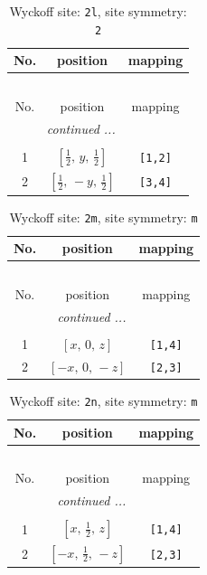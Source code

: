 \documentclass[fleqn,8pt]{jsarticle}
\begin{document}
\renewcommand{\arraystretch}{1.2}
\begin{longtable}{ccc}
\caption{Wyckoff site: {\tt 2l}, site symmetry: {\tt 2}}
 \\
 \hline \hline
No. & position & mapping \\ \hline \endfirsthead

\multicolumn{2}{l}{\tablename\ \thetable{}} \\
 \hline \hline
No. & position & mapping \\ \hline \endhead

 \hline \hline
\multicolumn{2}{r}{\footnotesize\it continued ...} \\ \endfoot

 \hline \hline
\multicolumn{2}{r}{} \\ \endlastfoot

1 & $\left[ \frac{1}{2},\, y,\, \frac{1}{2} \right]$ & {\tt [1,2]} \\ \hline
2 & $\left[ \frac{1}{2},\, - y,\, \frac{1}{2} \right]$ & {\tt [3,4]} \\
\end{longtable}
\renewcommand{\arraystretch}{1.2}
\begin{longtable}{ccc}
\caption{Wyckoff site: {\tt 2m}, site symmetry: {\tt m}}
 \\
 \hline \hline
No. & position & mapping \\ \hline \endfirsthead

\multicolumn{2}{l}{\tablename\ \thetable{}} \\
 \hline \hline
No. & position & mapping \\ \hline \endhead

 \hline \hline
\multicolumn{2}{r}{\footnotesize\it continued ...} \\ \endfoot

 \hline \hline
\multicolumn{2}{r}{} \\ \endlastfoot

1 & $\left[ x,\, 0,\, z \right]$ & {\tt [1,4]} \\ \hline
2 & $\left[ - x,\, 0,\, - z \right]$ & {\tt [2,3]} \\
\end{longtable}
\renewcommand{\arraystretch}{1.2}
\begin{longtable}{ccc}
\caption{Wyckoff site: {\tt 2n}, site symmetry: {\tt m}}
 \\
 \hline \hline
No. & position & mapping \\ \hline \endfirsthead

\multicolumn{2}{l}{\tablename\ \thetable{}} \\
 \hline \hline
No. & position & mapping \\ \hline \endhead

 \hline \hline
\multicolumn{2}{r}{\footnotesize\it continued ...} \\ \endfoot

 \hline \hline
\multicolumn{2}{r}{} \\ \endlastfoot

1 & $\left[ x,\, \frac{1}{2},\, z \right]$ & {\tt [1,4]} \\ \hline
2 & $\left[ - x,\, \frac{1}{2},\, - z \right]$ & {\tt [2,3]} \\
\end{longtable}
\end{document}
